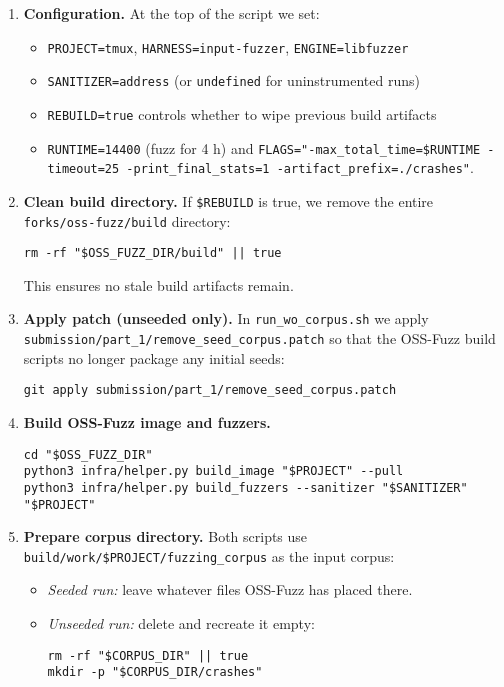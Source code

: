 \documentclass[11pt,a4paper,twocolumn]{article}
\begin{document}
\begin{enumerate}
	\item \textbf{Configuration.}
	      At the top of the script we set:
	      \begin{itemize}
		      \item \texttt{PROJECT=tmux}, \texttt{HARNESS=input-fuzzer}, \texttt{ENGINE=libfuzzer}
		      \item \texttt{SANITIZER=address} (or \texttt{undefined} for uninstrumented runs)
		      \item \texttt{REBUILD=true} controls whether to wipe previous build artifacts
		      \item \texttt{RUNTIME=14400} (fuzz for 4 h) and
		            \texttt{FLAGS="-max\_total\_time=\$RUNTIME -timeout=25 -print\_final\_stats=1 -artifact\_prefix=./crashes"}.
	      \end{itemize}

	\item \textbf{Clean build directory.}
	      If \texttt{\$REBUILD} is true, we remove the entire \texttt{forks/oss-fuzz/build} directory:
	      \begin{verbatim}
rm -rf "$OSS_FUZZ_DIR/build" || true
    \end{verbatim}
	      This ensures no stale build artifacts remain.

	\item \textbf{Apply patch (unseeded only).}
	      In \texttt{run\_wo\_corpus.sh} we apply
	      \texttt{submission/part\_1/remove\_seed\_corpus.patch} so that the OSS-Fuzz build scripts no longer package any initial seeds:
	      \begin{verbatim}
git apply submission/part_1/remove_seed_corpus.patch
    \end{verbatim}

	\item \textbf{Build OSS-Fuzz image and fuzzers.}
	      \begin{verbatim}
cd "$OSS_FUZZ_DIR"
python3 infra/helper.py build_image "$PROJECT" --pull
python3 infra/helper.py build_fuzzers --sanitizer "$SANITIZER" "$PROJECT"
    \end{verbatim}

	\item \textbf{Prepare corpus directory.}
	      Both scripts use
	      \texttt{build/work/\$PROJECT/fuzzing\_corpus} as the input corpus:
	      \begin{itemize}
		      \item \emph{Seeded run:} leave whatever files OSS-Fuzz has placed there.
		      \item \emph{Unseeded run:} delete and recreate it empty:
		            \begin{verbatim}
rm -rf "$CORPUS_DIR" || true
mkdir -p "$CORPUS_DIR/crashes"
\end{verbatim}
	      \end{itemize}


\end{enumerate}
\end{document}
